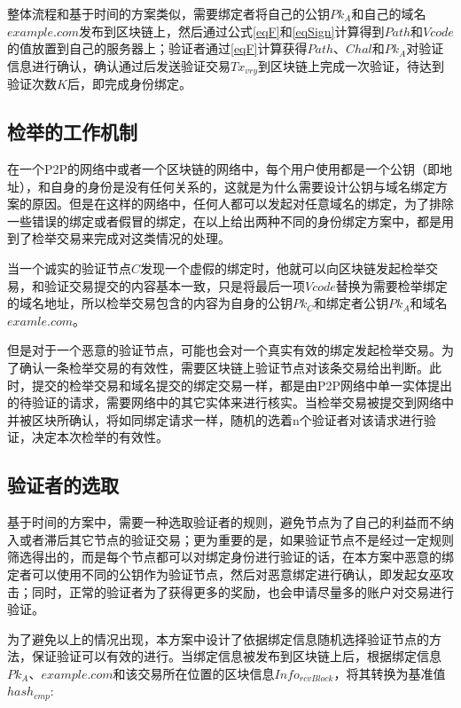 整体流程和基于时间的方案类似，需要绑定者将自己的公钥$Pk_A$和自己的域名$example.com$发布到区块链上，然后通过公式\eqref{eqF}和\eqref{eqSign}计算得到$Path$和$Vcode$的值放置到自己的服务器上；验证者通过\eqref{eqF}计算获得$Path$、$Chal$和$Pk_A$对验证信息进行确认，确认通过后发送验证交易$Tx_{vry}$到区块链上完成一次验证，待达到验证次数$K$后，即完成身份绑定。


\subsection{检举的工作机制}

在一个P2P的网络中或者一个区块链的网络中，每个用户使用都是一个公钥（即地址），和自身的身份是没有任何关系的，这就是为什么需要设计公钥与域名绑定方案的原因。但是在这样的网络中，任何人都可以发起对任意域名的绑定，为了排除一些错误的绑定或者假冒的绑定，在以上给出两种不同的身份绑定方案中，都是用到了检举交易来完成对这类情况的处理。


当一个诚实的验证节点$C$发现一个虚假的绑定时，他就可以向区块链发起检举交易，和验证交易提交的内容基本一致，只是将最后一项$Vcode$替换为需要检举绑定的域名地址，所以检举交易包含的内容为自身的公钥$Pk_C$和绑定者公钥$Pk_A$和域名$examle.com$。


但是对于一个恶意的验证节点，可能也会对一个真实有效的绑定发起检举交易。为了确认一条检举交易的有效性，需要区块链上验证节点对该条交易给出判断。此时，提交的检举交易和域名提交的绑定交易一样，都是由P2P网络中单一实体提出的待验证的请求，需要网络中的其它实体来进行核实。当检举交易被提交到网络中并被区块所确认，将如同绑定请求一样，随机的选着n个验证者对该请求进行验证，决定本次检举的有效性。


\subsection{验证者的选取}

基于时间的方案中，需要一种选取验证者的规则，避免节点为了自己的利益而不纳入或者滞后其它节点的验证交易；更为重要的是，如果验证节点不是经过一定规则筛选得出的，而是每个节点都可以对绑定身份进行验证的话，在本方案中恶意的绑定者可以使用不同的公钥作为验证节点，然后对恶意绑定进行确认，即发起女巫攻击；同时，正常的验证者为了获得更多的奖励，也会申请尽量多的账户对交易进行验证。

为了避免以上的情况出现，本方案中设计了依据绑定信息随机选择验证节点的方法，保证验证可以有效的进行。当绑定信息被发布到区块链上后，根据绑定信息$Pk_A$、$example.com$和该交易所在位置的区块信息$Info_{rcvBlock}$，将其转换为基准值$hash_{cmp}$:

